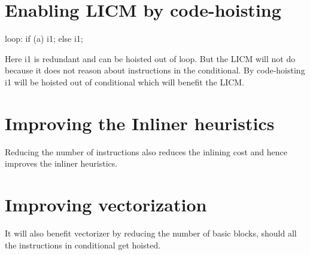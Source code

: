 \documentclass{sig-alternate}
\begin{document}
\section{Enabling LICM by code-hoisting}
loop:
if (a)
  i1;
else
  i1;

Here i1 is redundant and can be hoisted out of loop. But the LICM will
not do because it does not reason about instructions in the
conditional.  By code-hoisting i1 will be hoisted out of conditional
which will benefit the LICM.

\section{Improving the Inliner heuristics}
Reducing the number of instructions also reduces the inlining cost and
hence improves the inliner heuristics.

\section{Improving vectorization}
It will also benefit vectorizer by reducing the number
of basic blocks, should all the instructions in conditional get hoisted.



{\small

}
\end{document}
